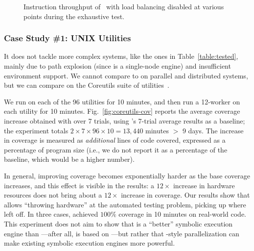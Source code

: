 \begin{figure}[h!]
  \centering
  \caption{Instruction throughput of \cnine\ with load balancing disabled at various points during the exhaustive test.}
  \label{fig:scalab-static-balancing}
  \vspace{-0.5cm}
\end{figure}

\subsubsection{Case Study \#1: UNIX Utilities}
\label{sec:coreutils}

  It does not tackle more complex systems, like the ones in Table~\ref{table:tested}, mainly due to path explosion (since \klee is a single-node engine) and insufficient environment support.  We cannot compare \cnine to \klee on parallel and distributed systems, but we can compare on the Coreutils suite of \unix utilities~\cite{coreutils}.

We run \klee on each of the 96 utilities for 10 minutes, and then  run a 12-worker \cnine on each utility for 10 minutes. Fig.~\ref{fig:coreutils-cov} reports the average coverage increase obtained with \cnine over 7 trials, using \klee's 7-trial average results as a baseline; the experiment totals $2 \times 7 \times 96 \times 10 = 13,440$ minutes $>$ 9 days.  The increase in coverage is measured as {\em additional} lines of code covered, expressed as a percentage of program size (i.e., we do not report it as a percentage of the baseline, which would be a higher number).

  In general, improving coverage becomes exponentially harder as the base coverage increases, and this effect is visible in the results: a $12\times$ increase in hardware resources does not bring about a $12\times$ increase in coverage.  Our results show that \cnine allows ``throwing hardware'' at the automated testing problem, picking up where \klee left off.  In three cases, \cnine achieved $100\%$ coverage in 10 minutes on real-world code.  This experiment does not aim to show that \cnine is a ``better'' symbolic execution engine than \klee---after all, \cnine is based on \klee---but rather that \cnine-style parallelization can make existing symbolic execution engines more powerful.

